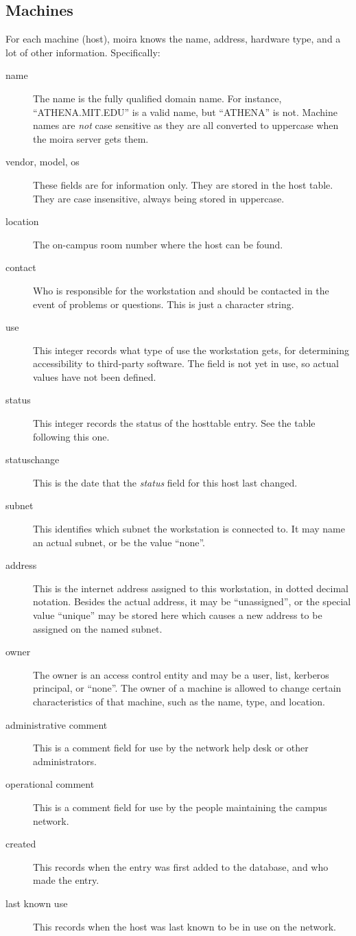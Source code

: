 \subsection{Machines}
For each machine (host), moira knows the name, address, hardware type,
and a lot of other information. Specifically:
\begin{description}
\item[name] The name is the fully qualified domain name.  For
instance, ``ATHENA.MIT.EDU'' is a valid name, but ``ATHENA'' is not.
 Machine names are {\em not} case sensitive as they
are all converted to uppercase when the moira server gets them.
\item[vendor, model, os] These fields are for information only.  They
are stored in the host table.  They are case insensitive, always being
stored in uppercase.
\item[location] The on-campus room number where the host can be found.
\item[contact] Who is responsible for the workstation and should be
contacted in the event of problems or questions.  This is just a
character string.
\item[use] This integer records what type of use the workstation gets,
for determining accessibility to third-party software.  The field is
not yet in use, so actual values have not been defined.
\item[status] This integer records the status of the hosttable entry.
See the table following this one.
\item[statuschange] This is the date that the {\em status} field for
this host last changed.
\item[subnet] This identifies which subnet the workstation is
connected to.  It may name an actual subnet, or be the value ``none''.
\item[address] This is the internet address assigned to this
workstation, in dotted decimal notation.  Besides the actual address,
it may be ``unassigned'', or the special value ``unique'' may be
stored here which causes a new address to be assigned on the named
subnet.
\item[owner] The owner is an access control entity and may be a user,
list, kerberos principal, or ``none''.  The owner of a machine is
allowed to change certain characteristics of that machine, such as the
name, type, and location.
\item[administrative comment] This is a comment field for use by the
network help desk or other administrators.
\item[operational comment] This is a comment field for use by the
people maintaining the campus network.
\item[created] This records when the entry was first added to the
database, and who made the entry.
\item[last known use] This records when the host was last known to be
in use on the network.
\end{description}

